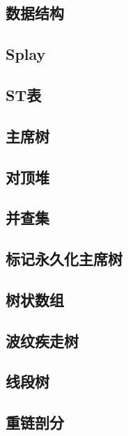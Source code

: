 \documentclass{article}
\begin{document}
\begin{multicols*}{2}
\section{数据结构}
\subsection{Splay}

\subsection{ST表}

\subsection{主席树}

\subsection{对顶堆}

\subsection{并查集}

\subsection{标记永久化主席树}

\subsection{树状数组}

\subsection{波纹疾走树}

\subsection{线段树}

\subsection{重链剖分}


\end{multicols*}
\end{document}
